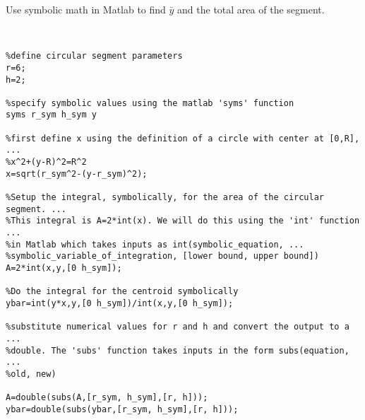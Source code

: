 Use symbolic math in Matlab to find $\bar{y}$ and the total area of the segment.

\begin{solution} \
\begin{lstlisting}
%define circular segment parameters
r=6;
h=2;

%specify symbolic values using the matlab 'syms' function
syms r_sym h_sym y

%first define x using the definition of a circle with center at [0,R], ...
%x^2+(y-R)^2=R^2
x=sqrt(r_sym^2-(y-r_sym)^2);

%Setup the integral, symbolically, for the area of the circular segment. ... 
%This integral is A=2*int(x). We will do this using the 'int' function ...
%in Matlab which takes inputs as int(symbolic_equation, ...
%symbolic_variable_of_integration, [lower bound, upper bound])
A=2*int(x,y,[0 h_sym]);

%Do the integral for the centroid symbolically
ybar=int(y*x,y,[0 h_sym])/int(x,y,[0 h_sym]);

%substitute numerical values for r and h and convert the output to a ...
%double. The 'subs' function takes inputs in the form subs(equation, ...
%old, new)

A=double(subs(A,[r_sym, h_sym],[r, h]));
ybar=double(subs(ybar,[r_sym, h_sym],[r, h]));
\end{lstlisting}
\end{solution}